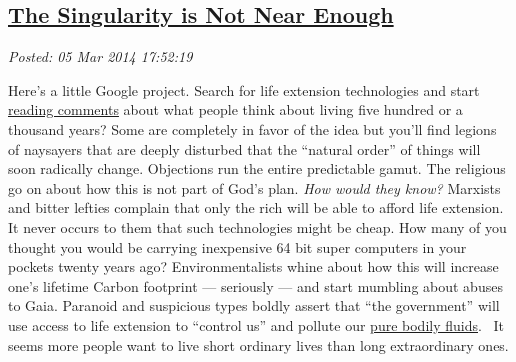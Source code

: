 %

\subsection*{\href{https://bakerjd99.wordpress.com/2014/03/05/the-singularity-is-not-near-enough/}{The Singularity is Not Near Enough}}


\noindent\emph{Posted: 05 Mar 2014 17:52:19}
\vspace{6pt}

Here's a little Google project. Search for life extension technologies
and start
\href{http://www.dailymail.co.uk/sciencetech/article-2523086/Could-humans-live-500-years-old-Scientists-believe-genetic-tweaks-significantly-extend-lifespan.html}{reading
comments} about what people think about living five hundred or a
thousand years? Some are completely in favor of the idea but you'll find
legions of naysayers that are deeply disturbed that the ``natural
order'' of things will soon radically change. Objections run the entire
predictable gamut. The religious go on about how this is not part of
God's plan. \emph{How would they know?} Marxists and bitter lefties
complain that only the rich will be able to afford life extension. It
never occurs to them that such technologies might be cheap. How many of
you thought you would be carrying inexpensive 64 bit super computers in
your pockets twenty years ago? Environmentalists whine about how this
will increase one's lifetime Carbon footprint --- seriously --- and
start mumbling about abuses to Gaia. Paranoid and suspicious types
boldly assert that ``the government'' will use access to life extension
to ``control us'' and pollute our
\href{http://www.youtube.com/watch?v=N1KvgtEnABY}{pure bodily fluids}.~
It seems more people want to live short ordinary lives than long
extraordinary ones.

